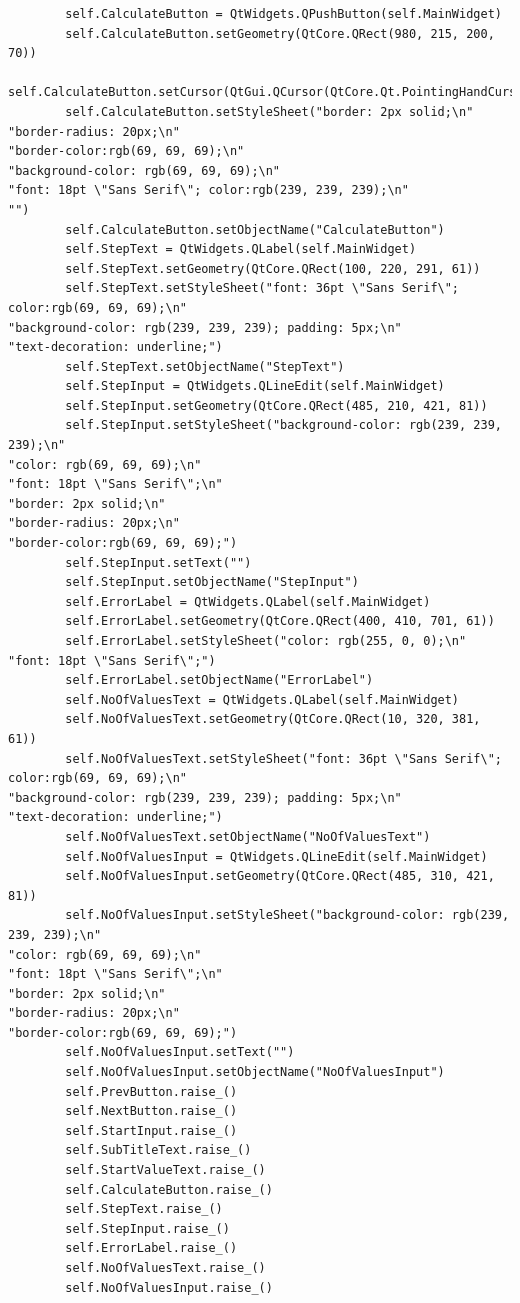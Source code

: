 \documentclass[12pt]{article}
\begin{document}
\begin{lstlisting}
        self.CalculateButton = QtWidgets.QPushButton(self.MainWidget)
        self.CalculateButton.setGeometry(QtCore.QRect(980, 215, 200, 70))
        self.CalculateButton.setCursor(QtGui.QCursor(QtCore.Qt.PointingHandCursor))
        self.CalculateButton.setStyleSheet("border: 2px solid;\n"
"border-radius: 20px;\n"
"border-color:rgb(69, 69, 69);\n"
"background-color: rgb(69, 69, 69);\n"
"font: 18pt \"Sans Serif\"; color:rgb(239, 239, 239);\n"
"")
        self.CalculateButton.setObjectName("CalculateButton")
        self.StepText = QtWidgets.QLabel(self.MainWidget)
        self.StepText.setGeometry(QtCore.QRect(100, 220, 291, 61))
        self.StepText.setStyleSheet("font: 36pt \"Sans Serif\"; color:rgb(69, 69, 69);\n"
"background-color: rgb(239, 239, 239); padding: 5px;\n"
"text-decoration: underline;")
        self.StepText.setObjectName("StepText")
        self.StepInput = QtWidgets.QLineEdit(self.MainWidget)
        self.StepInput.setGeometry(QtCore.QRect(485, 210, 421, 81))
        self.StepInput.setStyleSheet("background-color: rgb(239, 239, 239);\n"
"color: rgb(69, 69, 69);\n"
"font: 18pt \"Sans Serif\";\n"
"border: 2px solid;\n"
"border-radius: 20px;\n"
"border-color:rgb(69, 69, 69);")
        self.StepInput.setText("")
        self.StepInput.setObjectName("StepInput")
        self.ErrorLabel = QtWidgets.QLabel(self.MainWidget)
        self.ErrorLabel.setGeometry(QtCore.QRect(400, 410, 701, 61))
        self.ErrorLabel.setStyleSheet("color: rgb(255, 0, 0);\n"
"font: 18pt \"Sans Serif\";")
        self.ErrorLabel.setObjectName("ErrorLabel")
        self.NoOfValuesText = QtWidgets.QLabel(self.MainWidget)
        self.NoOfValuesText.setGeometry(QtCore.QRect(10, 320, 381, 61))
        self.NoOfValuesText.setStyleSheet("font: 36pt \"Sans Serif\"; color:rgb(69, 69, 69);\n"
"background-color: rgb(239, 239, 239); padding: 5px;\n"
"text-decoration: underline;")
        self.NoOfValuesText.setObjectName("NoOfValuesText")
        self.NoOfValuesInput = QtWidgets.QLineEdit(self.MainWidget)
        self.NoOfValuesInput.setGeometry(QtCore.QRect(485, 310, 421, 81))
        self.NoOfValuesInput.setStyleSheet("background-color: rgb(239, 239, 239);\n"
"color: rgb(69, 69, 69);\n"
"font: 18pt \"Sans Serif\";\n"
"border: 2px solid;\n"
"border-radius: 20px;\n"
"border-color:rgb(69, 69, 69);")
        self.NoOfValuesInput.setText("")
        self.NoOfValuesInput.setObjectName("NoOfValuesInput")
        self.PrevButton.raise_()
        self.NextButton.raise_()
        self.StartInput.raise_()
        self.SubTitleText.raise_()
        self.StartValueText.raise_()
        self.CalculateButton.raise_()
        self.StepText.raise_()
        self.StepInput.raise_()
        self.ErrorLabel.raise_()
        self.NoOfValuesText.raise_()
        self.NoOfValuesInput.raise_()


\end{lstlisting}
\end{document}
